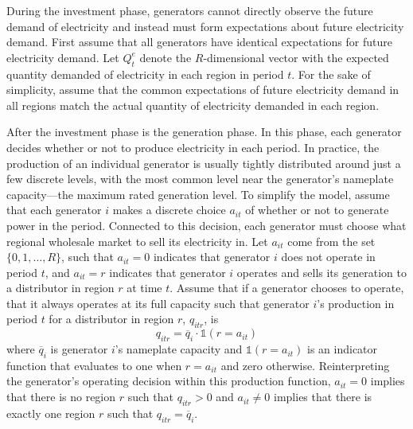 During the investment phase, generators cannot directly observe the future demand of electricity and instead must form expectations about future electricity demand. First assume that all generators have identical expectations for future electricity demand. Let $Q_t^e$ denote the $R$-dimensional vector with the expected quantity demanded of electricity in each region in period $t$. For the sake of simplicity, assume that the common expectations of future electricity demand in all regions match the actual quantity of electricity demanded in each region. 

After the investment phase is the generation phase. In this phase, each generator decides whether or not to produce electricity in each period. In practice, the production of an individual generator is usually tightly distributed around just a few discrete levels, with the most common level near the generator's nameplate capacity---the maximum rated generation level. To simplify the model, assume that each generator $i$ makes a discrete choice $a_{it}$ of whether or not to generate power in the period. Connected to this decision, each generator must choose what regional wholesale market to sell its electricity in. Let $a_{it}$ come from the set $\{0, 1, \ldots, R\}$, such that $a_{it} = 0$ indicates that generator $i$ does not operate in period $t$, and $a_{it} = r$ indicates that generator $i$ operates and sells its generation to a distributor in region $r$ at time $t$. Assume that if a generator chooses to operate, that it always operates at its full capacity such that generator $i$'s production in period $t$ for a distributor in region $r$,  $q_{itr}$, is
\begin{equation}
    q_{itr} = \overline{q}_i \cdot \mathds{1}(r = a_{it})
\end{equation}
where $\overline{q}_i$ is generator $i$'s nameplate capacity and $\mathds{1}(r = a_{it})$ is an indicator function that evaluates to one when $r = a_{it}$ and zero otherwise. Reinterpreting the generator's operating decision within this production function, $a_{it} = 0$ implies that there is no region $r$ such that $q_{itr} > 0$ and $a_{it} \neq 0$ implies that there is exactly one region $r$ such that $q_{itr} = \overline{q}_i$. 

